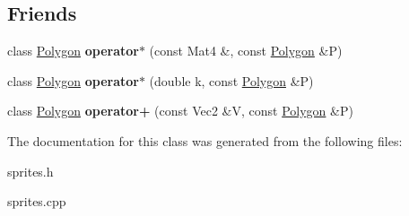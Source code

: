 \subsection*{Friends}
\begin{DoxyCompactItemize}
\item 
\hypertarget{classg2c_1_1_polygon_a1c64eb1893a94ae78e7cc470f8531f3f}{
class \hyperlink{classg2c_1_1_polygon}{Polygon} {\bfseries operator$\ast$} (const Mat4 \&, const \hyperlink{classg2c_1_1_polygon}{Polygon} \&P)}
\label{classg2c_1_1_polygon_a1c64eb1893a94ae78e7cc470f8531f3f}

\item 
\hypertarget{classg2c_1_1_polygon_aee40ba04c874821ab064551b0c729561}{
class \hyperlink{classg2c_1_1_polygon}{Polygon} {\bfseries operator$\ast$} (double k, const \hyperlink{classg2c_1_1_polygon}{Polygon} \&P)}
\label{classg2c_1_1_polygon_aee40ba04c874821ab064551b0c729561}

\item 
\hypertarget{classg2c_1_1_polygon_a6c70c2be591e72940dc345f9b357cca6}{
class \hyperlink{classg2c_1_1_polygon}{Polygon} {\bfseries operator+} (const Vec2 \&V, const \hyperlink{classg2c_1_1_polygon}{Polygon} \&P)}
\label{classg2c_1_1_polygon_a6c70c2be591e72940dc345f9b357cca6}

\end{DoxyCompactItemize}


The documentation for this class was generated from the following files:\begin{DoxyCompactItemize}
\item 
sprites.h\item 
sprites.cpp\end{DoxyCompactItemize}
